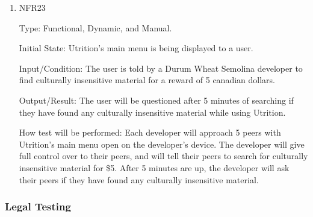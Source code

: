 \documentclass[12pt, titlepage]{article}
\begin{document}
\begin{enumerate}
\item{NFR23\\} 

Type: Functional, Dynamic, and Manual.

Initial State: Utrition’s main menu is being displayed to a user.

Input/Condition: The user is told by a Durum Wheat Semolina developer to find culturally insensitive material for a reward of 5 canadian dollars.

Output/Result: The user will be questioned after 5 minutes of searching if they have found any culturally insensitive material while using Utrition.

How test will be performed: Each developer will approach 5 peers with Utrition’s main menu open on the developer’s device. The developer will give full control over to their peers, and will tell their peers to search for culturally insensitive material for \$5. After 5 minutes are up, the developer will ask their peers if they have found any culturally insensitive material.

\end{enumerate}

\subsubsection{Legal Testing}

\end{document}
